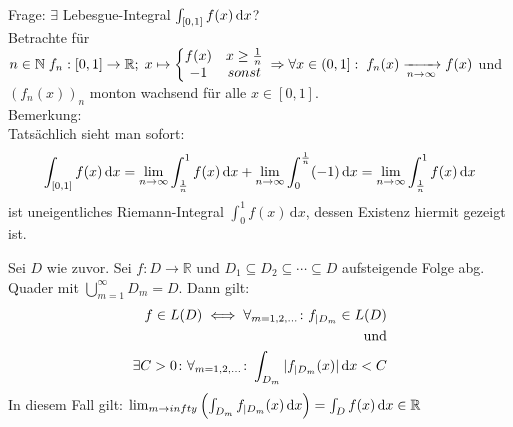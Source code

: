 Frage: $\exists$ Lebesgue-Integral $\int_{[0,1]} f(x) \,\text{d}x$?\\
Betrachte für $n\in\mathbb{N}\; f_n:[0,1]\to\mathbb{R};\;x\mapsto\left\{\begin{matrix}
    f(x) & x\geq \frac{1}{n}\\
    -1 & sonst
\end{matrix}\right.\\\Rightarrow \forall x\in (0,1]:\;f_n(x)\xrightarrow[n\to\infty]{}f(x)$ und $(f_n(x))_n$ monton wachsend für alle $x\in [0,1]$.\\
Bemerkung:\\
Tatsächlich sieht man sofort:
\[\int_{[0,1]} f(x) \,\text{d}x = \lim_{n\to\infty}\int_{\frac{1}{n}}^1f(x)\,\text{d}x + \lim_{n\to\infty}\int_0^{\frac{1}{n}}(-1)\,\text{d}x = \lim_{n\to\infty}\int_{\frac{1}{n}}^1f(x)\,\text{d}x\]
ist uneigentliches Riemann-Integral $\int_0^1f(x)\,\text{d}x$, dessen Existenz hiermit gezeigt ist.

\begin{korollar}
    Sei $D$ wie zuvor. Sei $f\colon D\to\mathbb{R}$ und $D_1\subseteq D_2\subseteq\cdots\subseteq D$ aufsteigende Folge abg. Quader mit $\bigcup_{m=1}^\infty D_m = D$. Dann gilt:
    \begin{align*}
        f\in L(D)\iff \forall_{m=1,2,\dots}\colon f_{|D_m}\in L(D)\\
        \text{und}\\
        \exists C > 0\colon \forall_{m=1,2,\dots}\colon\int_{{D_m}} |{f_{|D_m}(x)}| \,\text{d}x < C\\
    \end{align*}
    In diesem Fall gilt: $\lim_{m \to infty}\left(\int_{{D_m}} {f_{|D_m}}(x) \,\text{d}x\right) = \int_{D} f(x) \,\text{d}x \in \mathbb{R}$
\end{korollar}